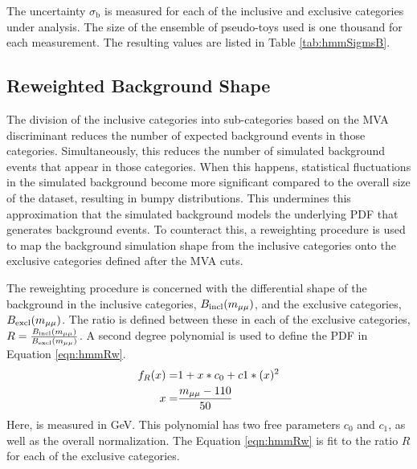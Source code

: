 The uncertainty $\sigma_\text{b}$ is measured for each of the inclusive and exclusive categories under analysis.
The size of the ensemble of pseudo-toys used is one thousand for each measurement.
The resulting values are listed in Table \ref{tab:hmmSigmsB}.


\subsection{Reweighted Background Shape}\label{sec:hmmRw}

The division of the inclusive categories into sub-categories based on the MVA discriminant reduces the number of expected background events in those categories.
Simultaneously, this reduces the number of simulated background events that appear in those categories.
When this happens, statistical fluctuations in the simulated background become more significant compared to the overall size of the dataset, resulting in bumpy \muu distributions.
This undermines this approximation that the simulated background models the underlying PDF that generates background events.
To counteract this, a reweighting procedure is used to map the background simulation shape from the inclusive categories onto the exclusive categories defined after the MVA cuts.

The reweighting procedure is concerned with the differential \muu shape of the background in the inclusive categories, $B_\text{incl}(m_{\mu\mu})$, and the exclusive categories, $B_\text{excl}(m_{\mu\mu})$.
The ratio is defined between these in each of the exclusive categories, $R=\frac{B_\text{incl}(m_{\mu\mu})}{B_\text{excl}(m_{\mu\mu})}$.
A second degree polynomial is used to define the PDF in Equation \ref{eqn:hmmRw}.
\begin{equation}\begin{split} \label{eqn:hmmRw}
f_R(x)=&1+x*c_0+c 1*(x)^2 \\
x=&\frac{m_{\mu\mu}-110}{50} \\
\end{split}\end{equation} 
Here, \muu is measured in GeV.
This polynomial has two free parameters $c_0$ and $c_1$, as well as the overall normalization.
The Equation \ref{eqn:hmmRw} is fit to the ratio $R$ for each of the exclusive categories.

